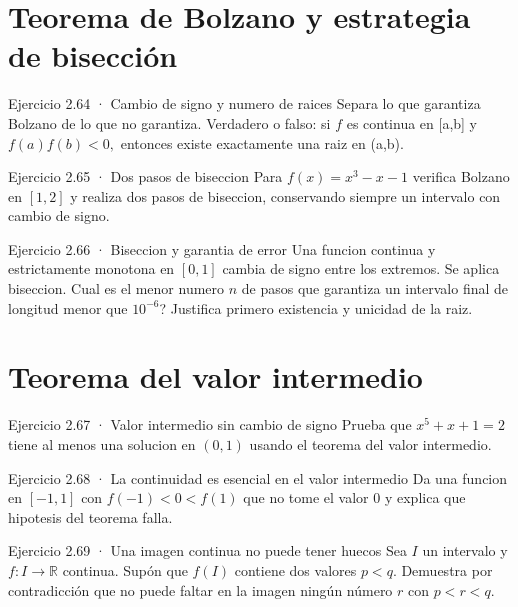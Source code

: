 \documentclass[10pt,a4paper,oneside,openany]{book}
\begin{document}
\section{Teorema de Bolzano y estrategia de bisección}
\begin{PSevenExerciseFixed}{Ejercicio 2.64 · Cambio de signo y numero de raices}
Separa lo que garantiza Bolzano de lo que no garantiza. Verdadero o falso: si \(f\) es continua en [a,b] y \(f(a)f(b)<0,\) entonces existe exactamente una raiz en (a,b).
\end{PSevenExerciseFixed}
\begin{PSevenExerciseFixed}{Ejercicio 2.65 · Dos pasos de biseccion}
Para \(f(x)=x^{3}-x-1\) verifica Bolzano en \([1,2]\) y realiza dos pasos de biseccion, conservando siempre un intervalo con cambio de signo.
\end{PSevenExerciseFixed}
\begin{PSevenExerciseFixed}{Ejercicio 2.66 · Biseccion y garantia de error}
Una funcion continua y estrictamente monotona en \([0,1]\) cambia de signo entre los extremos. Se aplica biseccion. Cual es el menor numero \(n\) de pasos que garantiza un intervalo final de longitud menor que \(10^{-6}\)? Justifica primero existencia y unicidad de la raiz.
\end{PSevenExerciseFixed}
\section{Teorema del valor intermedio}
\begin{PSevenExerciseFixed}{Ejercicio 2.67 · Valor intermedio sin cambio de signo}
Prueba que \(x^{5}+x+1=2\) tiene al menos una solucion en \((0,1)\) usando el teorema del valor intermedio.
\end{PSevenExerciseFixed}
\begin{PSevenExerciseFixed}{Ejercicio 2.68 · La continuidad es esencial en el valor intermedio}
Da una funcion en \([-1,1]\) con \(f(-1)<0<f(1)\) que no tome el valor \(0\) y explica que hipotesis del teorema falla.
\end{PSevenExerciseFixed}
\begin{PSevenExerciseFixed}{Ejercicio 2.69 · Una imagen continua no puede tener huecos}
Sea \(I\) un intervalo y \(f:I\to\mathbb R\) continua. Supón que \(f(I)\) contiene dos valores \(p<q\). Demuestra por contradicción que no puede faltar en la imagen ningún número \(r\) con \(p<r<q\).
\end{PSevenExerciseFixed}
\end{document}
